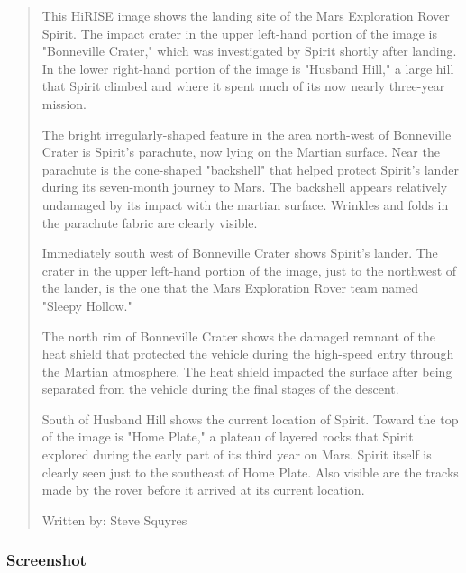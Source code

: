 \begin{quotation}
This HiRISE image shows the landing site of the Mars Exploration Rover
Spirit. The impact crater in the upper left-hand portion of the image
is "Bonneville Crater," which was investigated by Spirit shortly after
landing. In the lower right-hand portion of the image is "Husband
Hill," a large hill that Spirit climbed and where it spent much of its
now nearly three-year mission.

The bright irregularly-shaped feature in the area north-west of
Bonneville Crater is Spirit's parachute, now lying on the Martian
surface. Near the parachute is the cone-shaped "backshell" that helped
protect Spirit's lander during its seven-month journey to Mars. The
backshell appears relatively undamaged by its impact with the martian
surface. Wrinkles and folds in the parachute fabric are clearly
visible.

Immediately south west of Bonneville Crater shows Spirit's lander. The
crater in the upper left-hand portion of the image, just to the
northwest of the lander, is the one that the Mars Exploration Rover
team named "Sleepy Hollow."

The north rim of Bonneville Crater shows the damaged remnant of the
heat shield that protected the vehicle during the high-speed entry
through the Martian atmosphere. The heat shield impacted the surface
after being separated from the vehicle during the final stages of the
descent.

South of Husband Hill shows the current location of Spirit. Toward the
top of the image is "Home Plate," a plateau of layered rocks that
Spirit explored during the early part of its third year on
Mars. Spirit itself is clearly seen just to the southeast of Home
Plate. Also visible are the tracks made by the rover before it arrived
at its current location.

Written by: Steve Squyres
\end{quotation}

\subsubsection*{Screenshot}

